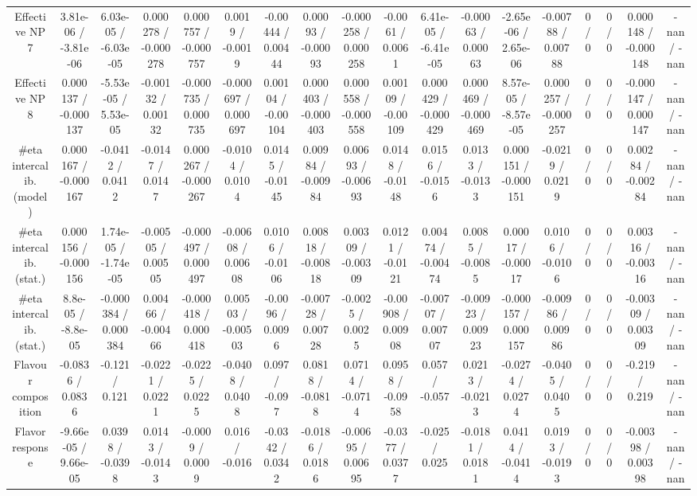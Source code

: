 \documentclass[10pt]{article}
\begin{document}
\begin{table}[htbp]
\begin{center}
\begin{tabular}{|c|c|c|c|c|c|c|c|c|c|c|c|c|c|c|c|c|c|}
  Effective NP 7 & 3.81e-06 / -3.81e-06 & 6.03e-05 / -6.03e-05 & 0.000278 / -0.000278 & 0.000757 / -0.000757 & 0.0019 / -0.0019 & -0.00444 / 0.00444 & 0.00093 / -0.00093 & -0.000258 / 0.000258 & -0.0061 / 0.0061 & 6.41e-05 / -6.41e-05 & -0.00063 / 0.00063 & -2.65e-06 / 2.65e-06 & -0.00788 / 0.00788 & 0 / 0 & 0 / 0 & 0.000148 / -0.000148 & -nan / -nan \\ 
  Effective NP 8 & 0.000137 / -0.000137 & -5.53e-05 / 5.53e-05 & -0.00132 / 0.00132 & -0.000735 / 0.000735 & -0.000697 / 0.000697 & 0.00104 / -0.00104 & 0.000403 / -0.000403 & 0.000558 / -0.000558 & 0.00109 / -0.00109 & 0.000429 / -0.000429 & 0.000469 / -0.000469 & 8.57e-05 / -8.57e-05 & 0.000257 / -0.000257 & 0 / 0 & 0 / 0 & -0.000147 / 0.000147 & -nan / -nan \\ 
  #eta intercalib. (model) & 0.000167 / -0.000167 & -0.0412 / 0.0412 & -0.0147 / 0.0147 & 0.000267 / -0.000267 & -0.0104 / 0.0104 & 0.0145 / -0.0145 & 0.00984 / -0.00984 & 0.00693 / -0.00693 & 0.0148 / -0.0148 & 0.0156 / -0.0156 & 0.0133 / -0.0133 & 0.000151 / -0.000151 & -0.0219 / 0.0219 & 0 / 0 & 0 / 0 & 0.00284 / -0.00284 & -nan / -nan \\ 
  #eta intercalib. (stat.) & 0.000156 / -0.000156 & 1.74e-05 / -1.74e-05 & -0.00505 / 0.00505 & -0.000497 / 0.000497 & -0.00608 / 0.00608 & 0.0106 / -0.0106 & 0.00818 / -0.00818 & 0.00309 / -0.00309 & 0.0121 / -0.0121 & 0.00474 / -0.00474 & 0.0085 / -0.0085 & 0.00017 / -0.00017 & 0.0106 / -0.0106 & 0 / 0 & 0 / 0 & 0.00316 / -0.00316 & -nan / -nan \\ 
  #eta intercalib. (stat.) & 8.8e-05 / -8.8e-05 & -0.000384 / 0.000384 & 0.00466 / -0.00466 & -0.000418 / 0.000418 & 0.00503 / -0.00503 & -0.0096 / 0.0096 & -0.00728 / 0.00728 & -0.0025 / 0.0025 & -0.00908 / 0.00908 & -0.00707 / 0.00707 & -0.00923 / 0.00923 & -0.000157 / 0.000157 & -0.00986 / 0.00986 & 0 / 0 & 0 / 0 & -0.00309 / 0.00309 & -nan / -nan \\ 
  Flavour composition & -0.0836 / 0.0836 & -0.121 / 0.121 & -0.0221 / 0.0221 & -0.0225 / 0.0225 & -0.0408 / 0.0408 & 0.097 / -0.097 & 0.0818 / -0.0818 & 0.0714 / -0.0714 & 0.0958 / -0.0958 & 0.057 / -0.057 & 0.0213 / -0.0213 & -0.0274 / 0.0274 & -0.0405 / 0.0405 & 0 / 0 & 0 / 0 & -0.219 / 0.219 & -nan / -nan \\ 
  Flavor response & -9.66e-05 / 9.66e-05 & 0.0398 / -0.0398 & 0.0143 / -0.0143 & -0.0009 / 0.0009 & 0.016 / -0.016 & -0.0342 / 0.0342 & -0.0186 / 0.0186 & -0.00695 / 0.00695 & -0.0377 / 0.0377 & -0.025 / 0.025 & -0.0181 / 0.0181 & 0.0414 / -0.0414 & 0.0193 / -0.0193 & 0 / 0 & 0 / 0 & -0.00398 / 0.00398 & -nan / -nan \\ 

\end{tabular}
\end{center}
\end{table}
\end{document}
